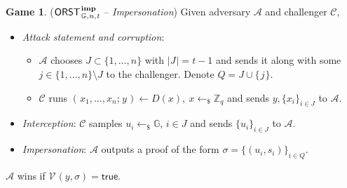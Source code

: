 \documentclass[10pt, psamsfonts, reqno]{amsart}
\theoremstyle{definition}
\newtheorem{attack_game}[thm]{Game}
\theoremstyle{remark}
\numberwithin{equation}{section}
\begin{document}
\begin{attack_game}\label{orst_attack_impersonation}
\vspace{3pt}
($
	\mathsf{ORST}
		_{\hspace{1pt}\mathbb{G},\hspace{0.5pt} n,\hspace{0.5pt} t}
		^{\hspace{1pt}\mathbf{imp}}
$
-- \textit{Impersonation})
Given adversary $\mathcal{A}$ and challenger $\mathcal{C}$,
\begin{itemize}[label=$\bullet$,leftmargin=20pt,rightmargin=0pt]
	\vspace{3pt}
	\item
		\textit{Attack statement and corruption}:
			\begin{itemize}[
				label=$\circ$,leftmargin=17pt,rightmargin=21pt
			]
			\vspace{3pt}
			\item $\mathcal{A}$ chooses $J \subset \{1, \dots, n\}$
				with $|J\hspace{1pt}| = t - 1$
				and sends it along with some
				$j \in \{1, \dots, n\} \setminus J$
				to the challenger.
				Denote $Q = J \cup \{\hspace{1pt}j\hspace{1pt}\}$.
				\vspace{3pt}
			\item $\mathcal{C}$ runs
				$(\hspace{1pt}x_1, \dots, x_n;\hspace{1pt} y\hspace{1pt})
				\leftarrow D(x), \ x \leftarrow_\$ \mathbb{Z}_q$
				and sends $y, \{x_i\}_{i \in J}$
				to $\mathcal{A}$.
			\vspace{5pt}
			\end{itemize}
	\item
		\textit{Interception}:
		$\mathcal{C}$ samples
		$u_i \leftarrow_\$ \mathbb{G},\hspace{2pt} i \in J$
		and sends $\{u_i\}_{i \in J}$
		to $\mathcal{A}$.\vspace{3pt}
	\item \textit{Impersonation}:
		$\mathcal{A}$ outputs a proof of the form
		$\sigma = \{(u_i, s_i)\}_{i \in Q}$.
\end{itemize}
\hspace*{5pt}%
\begin{minipage}{\dimexpr\textwidth-\parindent\relax}%
\vspace{5pt}
\hspace{3pt}
$\mathcal{A}$ wins if
$\mathcal{V}\hspace{1pt}(y, \sigma) = \textsf{true}$.
\end{minipage}%
\vspace{3pt}
\end{attack_game}
\end{document}
